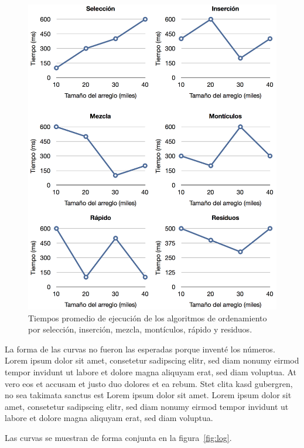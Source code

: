 \documentclass[twocolumn,english,spanish,journal]{IEEEtran}
\begin{document}
\begin{figure}
\begin{centering}
\includegraphics[scale=0.65]{lin}
\par\end{centering}

\caption{Tiempos promedio de ejecución de los algoritmos de ordenamiento por
selección, inserción, mezcla, montículos, rápido y residuos.\label{fig:lin}}
\end{figure}

La forma de las curvas no fueron las esperadas porque inventé los números. Lorem ipsum dolor sit amet, consetetur sadipscing elitr, sed diam nonumy eirmod tempor invidunt ut labore et dolore magna aliquyam erat, sed diam voluptua. At vero eos et accusam et justo duo dolores et ea rebum. Stet clita kasd gubergren, no sea takimata sanctus est Lorem ipsum dolor sit amet. Lorem ipsum dolor sit amet, consetetur sadipscing elitr, sed diam nonumy eirmod tempor invidunt ut labore et dolore magna aliquyam erat, sed diam voluptua.

Las curvas se muestran de forma conjunta en la figura~\ref{fig:log}.
\end{document}
